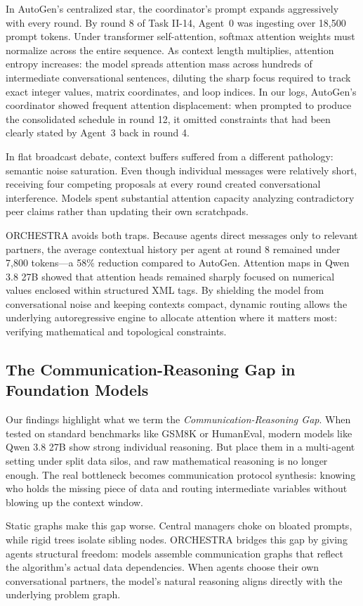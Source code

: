 \documentclass{ieeeaccess}
\begin{document}
In AutoGen's centralized star, the coordinator's prompt expands aggressively with every round. By round 8 of Task II-14, Agent~0 was ingesting over 18,500 prompt tokens. Under transformer self-attention, softmax attention weights must normalize across the entire sequence. As context length multiplies, attention entropy increases: the model spreads attention mass across hundreds of intermediate conversational sentences, diluting the sharp focus required to track exact integer values, matrix coordinates, and loop indices. In our logs, AutoGen's coordinator showed frequent attention displacement: when prompted to produce the consolidated schedule in round 12, it omitted constraints that had been clearly stated by Agent~3 back in round 4.

In flat broadcast debate, context buffers suffered from a different pathology: semantic noise saturation. Even though individual messages were relatively short, receiving four competing proposals at every round created conversational interference. Models spent substantial attention capacity analyzing contradictory peer claims rather than updating their own scratchpads.

ORCHESTRA avoids both traps. Because agents direct messages only to relevant partners, the average contextual history per agent at round 8 remained under 7,800 tokens---a 58\% reduction compared to AutoGen. Attention maps in Qwen 3.8 27B showed that attention heads remained sharply focused on numerical values enclosed within structured XML tags. By shielding the model from conversational noise and keeping contexts compact, dynamic routing allows the underlying autoregressive engine to allocate attention where it matters most: verifying mathematical and topological constraints.

\subsection{The Communication-Reasoning Gap in Foundation Models}
Our findings highlight what we term the \textit{Communication-Reasoning Gap}. When tested on standard benchmarks like GSM8K or HumanEval, modern models like Qwen 3.8 27B show strong individual reasoning. But place them in a multi-agent setting under split data silos, and raw mathematical reasoning is no longer enough. The real bottleneck becomes communication protocol synthesis: knowing who holds the missing piece of data and routing intermediate variables without blowing up the context window.

Static graphs make this gap worse. Central managers choke on bloated prompts, while rigid trees isolate sibling nodes. ORCHESTRA bridges this gap by giving agents structural freedom: models assemble communication graphs that reflect the algorithm's actual data dependencies. When agents choose their own conversational partners, the model's natural reasoning aligns directly with the underlying problem graph.
\end{document}
